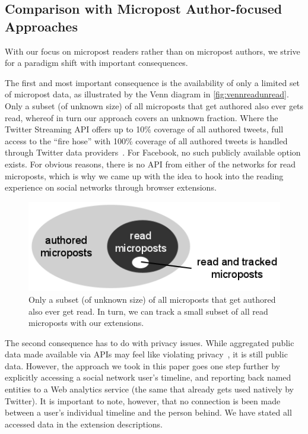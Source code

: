 \documentclass{iosart2c}
\begin{document}
\subsection{Comparison with Micropost Author-focused Approaches}
With our focus on micropost readers rather than on micropost authors, we strive for a paradigm shift with important consequences.

The first and most important consequence is the availability of only a limited set of micropost data, as illustrated by the Venn diagram in \autoref{fig:vennreadunread}.
Only a subset (of unknown size) of all microposts that get authored also ever gets read, whereof in turn our approach covers an unknown fraction.
Where the Twitter Streaming API offers up to 10\% coverage of all authored tweets, full access to the ``fire hose'' with 100\% coverage of all authored tweets is handled through Twitter data providers~\cite{dataproviders}.
For Facebook, no such publicly available option exists.
For obvious reasons, there is no API from either of the networks for read microposts, which is why we came up with the idea to hook into the reading experience on social networks through browser extensions.

\begin{figure}
\centering
\includegraphics[width=0.6\linewidth]{./resources/vennreadunread.png}
\caption{Only a subset (of unknown size) of all microposts that get authored also ever get read. In turn, we can track a small subset of all read microposts with our extensions.}
\label{fig:vennreadunread}
\end{figure}

The second consequence has to do with privacy issues.
While aggregated public data made available via APIs may feel like violating privacy~\cite{nyt}, it is still public data.
However, the approach we took in this paper goes one step further by explicitly accessing a social network user's timeline, and reporting back named entities to a Web analytics service (the same that already gets used natively by Twitter). 
It is important to note, however, that no connection is been made between a user's individual timeline and the person behind.
We have stated all accessed data in the extension descriptions.
\end{document}
